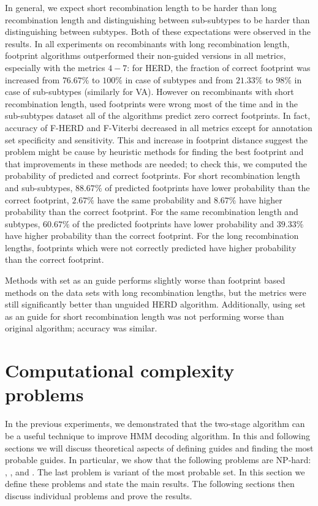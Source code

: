 In general, we expect short recombination length to be harder than long
recombination length and distinguishing between sub-subtypes to be harder than
distinguishing between subtypes. Both of these expectations were observed in
the results. In all experiments on recombinants with long recombination length,
footprint algorithms outperformed their non-guided versions in all metrics,
especially with the metrics $4-7$: for HERD, the fraction of correct footprint
was increased from $76.67\%$ to $100\%$ in case of subtypes and from $21.33\%$
to $98\%$ in case of sub-subtypes (similarly for VA). However on recombinants
with short recombination length, used footprints were wrong most of the time
and in the sub-subtypes dataset all of the algorithms predict zero correct
footprints.  In fact, accuracy of F-HERD and F-Viterbi decreased in all metrics
except for annotation set specificity and sensitivity. This and increase in
footprint distance suggest the problem might be cause by heuristic methods for
finding the best footprint and that improvements in these methods are needed;
to check this, we computed the probability of predicted and correct footprints.
For short recombination length and sub-subtypes, $88.67\%$ of predicted
footprints have lower probability than the correct footprint, $2.67\%$ have the
same probability and $8.67\%$ have higher probability than the correct
footprint.  For the same recombination length and subtypes, $60.67\%$ of the
predicted footprints have lower probability and $39.33\%$ have higher
probability than the correct footprint.  For the long recombination lengths,
footprints which were not correctly predicted have higher probability than the
correct footprint.

Methods with set as an guide performs slightly worse than footprint based
methods on the data sets with long recombination lengths, but the metrics were
still significantly better than unguided HERD algorithm.  Additionally, using
set as an guide for short recombination length was not performing worse than
original algorithm; accuracy was similar.

\section{Computational complexity problems}

In the previous experiments, we demonstrated that the two-stage algorithm can
be a useful technique to improve HMM decoding algorithm. In this and following
sections we will discuss theoretical aspects of defining guides and finding the
most probable guides. In particular, we show that the following problems are
NP-hard: , , and . The last problem is
variant of the most probable set. In this section we define these problems and
state the main results. The following sections then discuss individual problems
and prove the results.

